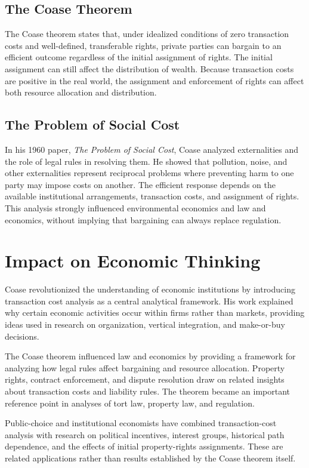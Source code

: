 \subsection*{The Coase Theorem}
The Coase theorem states that, under idealized conditions of zero transaction
costs and well-defined, transferable rights, private parties can bargain to an
efficient outcome regardless of the initial assignment of rights. The initial
assignment can still affect the distribution of wealth. Because transaction
costs are positive in the real world, the assignment and enforcement of rights
can affect both resource allocation and distribution.

\subsection*{The Problem of Social Cost}
In his 1960 paper, \textit{The Problem of Social Cost}, Coase analyzed externalities and
the role of legal rules in resolving them. He showed that pollution, noise, and
other externalities represent reciprocal problems where preventing harm to one
party may impose costs on another. The efficient response depends on the
available institutional arrangements, transaction costs, and assignment of
rights. This analysis strongly influenced environmental economics and law and
economics, without implying that bargaining can always replace regulation.

\section{Impact on Economic Thinking}
Coase revolutionized the understanding of economic institutions by introducing
transaction cost analysis as a central analytical framework. His work explained
why certain economic activities occur within firms rather than markets,
providing ideas used in research on organization, vertical integration, and
make-or-buy decisions.

The Coase theorem influenced law and economics by providing a framework for
analyzing how legal rules affect bargaining and resource allocation. Property
rights, contract enforcement, and dispute resolution draw on related insights
about transaction costs and liability rules. The theorem became an important
reference point in analyses of tort law, property law, and regulation.

Public-choice and institutional economists have combined transaction-cost
analysis with research on political incentives, interest groups, historical
path dependence, and the effects of initial property-rights assignments. These
are related applications rather than results established by the Coase theorem
itself.

